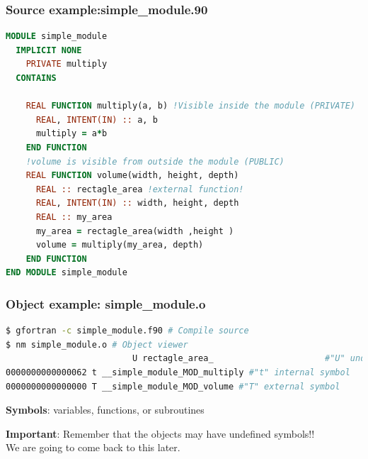 \documentclass[t]{myBeamer}
\begin{document}
\begin{frame}[fragile]
\frametitle{ \Large Source example:simple\_module.90 }
\footnotesize

\begin{lstlisting}[language=fortran]
MODULE simple_module
  IMPLICIT NONE
    PRIVATE multiply
  CONTAINS
    
    REAL FUNCTION multiply(a, b) !Visible inside the module (PRIVATE)
      REAL, INTENT(IN) :: a, b
      multiply = a*b
    END FUNCTION   
    !volume is visible from outside the module (PUBLIC)
    REAL FUNCTION volume(width, height, depth) 
      REAL :: rectagle_area !external function!
      REAL, INTENT(IN) :: width, height, depth
      REAL :: my_area	  
      my_area = rectagle_area(width ,height )
      volume = multiply(my_area, depth)
    END FUNCTION
END MODULE simple_module
\end{lstlisting}


\end{frame}

\begin{frame}[fragile,t]
\frametitle{ \Large Object example: simple\_module.o}
\footnotesize

\begin{lstlisting}[language=bash]
$ gfortran -c simple_module.f90 # Compile source
$ nm simple_module.o # Object viewer
                         U rectagle_area_                      #"U" undefined symbol
0000000000000062 t __simple_module_MOD_multiply #"t" internal symbol 
0000000000000000 T __simple_module_MOD_volume #"T" external symbol
\end{lstlisting}


\begin{tightBox}
\centering \Large
\textbf{Symbols}: variables, functions, or subroutines
\end{tightBox}

\begin{tightBox}
\centering \Large
\textbf{Important}: Remember that the objects may have undefined symbols!!
\\
\large We are going to come back to this later.
\end{tightBox}

\end{frame}
\end{document}
